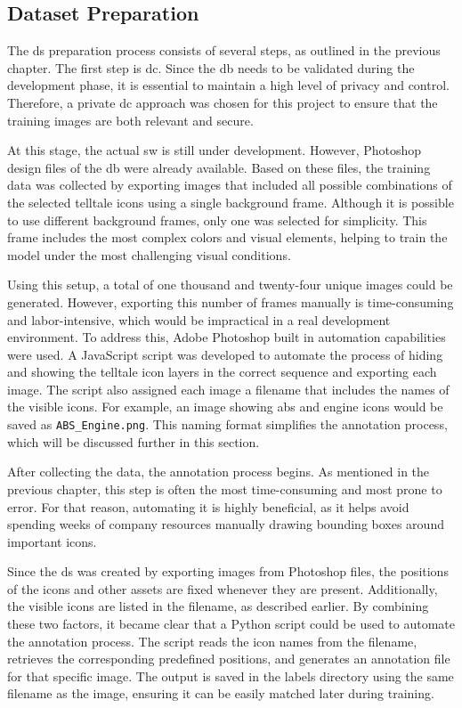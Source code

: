 \subsection{Dataset Preparation}
The \gls{ds} preparation process consists of several steps, as outlined in the previous chapter. The first step is \gls{dc}. Since the \gls{db} needs to be validated during the development phase, it is essential to maintain a high level of privacy and control. Therefore, a private \gls{dc} approach was chosen for this project to ensure that the training images are both relevant and secure.

At this stage, the actual \gls{sw} is still under development. However, Photoshop design files of the \gls{db} were already available. Based on these files, the training data was collected by exporting images that included all possible combinations of the selected telltale icons using a single background frame. Although it is possible to use different background frames, only one was selected for simplicity. This frame includes the most complex colors and visual elements, helping to train the model under the most challenging visual conditions.

Using this setup, a total of one thousand and twenty-four unique images could be generated. However, exporting this number of frames manually is time-consuming and labor-intensive, which would be impractical in a real development environment. To address this, Adobe Photoshop built in automation capabilities were used. A JavaScript script was developed to automate the process of hiding and showing the telltale icon layers in the correct sequence and exporting each image. The script also assigned each image a filename that includes the names of the visible icons. For example, an image showing \gls{abs} and engine icons would be saved as \texttt{ABS\_Engine.png}. This naming format simplifies the annotation process, which will be discussed further in this section.

After collecting the data, the annotation process begins. As mentioned in the previous chapter, this step is often the most time-consuming and most prone to error. For that reason, automating it is highly beneficial, as it helps avoid spending weeks of company resources manually drawing bounding boxes around important icons.

Since the \gls{ds} was created by exporting images from Photoshop files, the positions of the icons and other assets are fixed whenever they are present. Additionally, the visible icons are listed in the filename, as described earlier. By combining these two factors, it became clear that a Python script could be used to automate the annotation process. The script reads the icon names from the filename, retrieves the corresponding predefined positions, and generates an annotation file for that specific image. The output is saved in the labels directory using the same filename as the image, ensuring it can be easily matched later during training.

